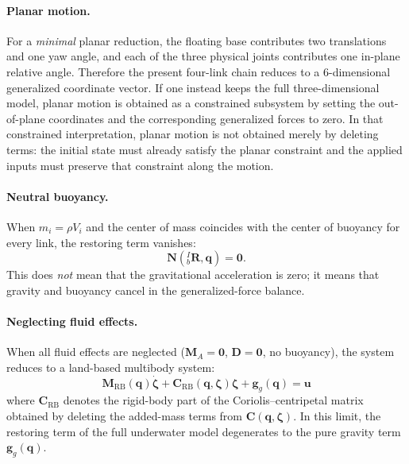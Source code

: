 \documentclass[12pt,a4paper]{report}
\begin{document}
\paragraph{Planar motion.}
For a \emph{minimal} planar reduction, the floating base contributes two translations and one yaw angle, and each of the three physical joints contributes one in-plane relative angle. Therefore the present four-link chain reduces to a 6-dimensional generalized coordinate vector. If one instead keeps the full three-dimensional model, planar motion is obtained as a constrained subsystem by setting the out-of-plane coordinates and the corresponding generalized forces to zero. In that constrained interpretation, planar motion is not obtained merely by deleting terms: the initial state must already satisfy the planar constraint and the applied inputs must preserve that constraint along the motion.

\paragraph{Neutral buoyancy.}
When $m_i = \rho V_i$ and the center of mass coincides with the center of buoyancy for every link, the restoring term vanishes:
\begin{equation}
\mathbf{N}({}_{b}^{I}\mathbf{R},\mathbf{q}) = \mathbf{0}.
\end{equation}
This does \emph{not} mean that the gravitational acceleration is zero; it means that gravity and buoyancy cancel in the generalized-force balance.

\paragraph{Neglecting fluid effects.}
When all fluid effects are neglected ($\mathbf{M}_A = \mathbf{0}$, $\mathbf{D} = \mathbf{0}$, no buoyancy), the system reduces to a land-based multibody system:
\begin{equation}
\mathbf{M}_{\text{RB}}(\mathbf{q})\dot{\boldsymbol{\zeta}} + \mathbf{C}_{\text{RB}}(\mathbf{q},\boldsymbol{\zeta})\boldsymbol{\zeta} + \mathbf{g}_g(\mathbf{q}) = \mathbf{u}
\end{equation}
where $\mathbf{C}_{\text{RB}}$ denotes the rigid-body part of the Coriolis--centripetal matrix obtained by deleting the added-mass terms from $\mathbf{C}(\mathbf{q},\boldsymbol{\zeta})$. In this limit, the restoring term of the full underwater model degenerates to the pure gravity term $\mathbf{g}_g(\mathbf{q})$.
\end{document}
